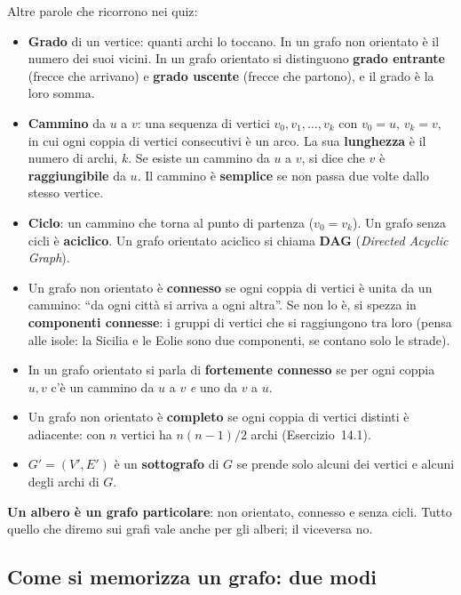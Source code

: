 Altre parole che ricorrono nei quiz:
\begin{itemize}
  \item \textbf{Grado} di un vertice: quanti archi lo toccano. In un grafo non orientato
        è il numero dei suoi vicini. In un grafo orientato si distinguono \textbf{grado
        entrante} (frecce che arrivano) e \textbf{grado uscente} (frecce che partono), e
        il grado è la loro somma.
  \item \textbf{Cammino} da $u$ a $v$: una sequenza di vertici $v_0, v_1, \ldots, v_k$
        con $v_0 = u$, $v_k = v$, in cui ogni coppia di vertici consecutivi è un arco. La
        sua \textbf{lunghezza} è il numero di archi, $k$. Se esiste un cammino da $u$ a
        $v$, si dice che $v$ è \textbf{raggiungibile} da $u$. Il cammino è
        \textbf{semplice} se non passa due volte dallo stesso vertice.
  \item \textbf{Ciclo}: un cammino che torna al punto di partenza ($v_0 = v_k$). Un
        grafo senza cicli è \textbf{aciclico}. Un grafo orientato aciclico si chiama
        \textbf{DAG} (\emph{Directed Acyclic Graph}).
  \item Un grafo non orientato è \textbf{connesso} se ogni coppia di vertici è unita da un
        cammino: ``da ogni città si arriva a ogni altra''. Se non lo è, si spezza in
        \textbf{componenti connesse}: i gruppi di vertici che si raggiungono tra loro
        (pensa alle isole: la Sicilia e le Eolie sono due componenti, se contano solo le
        strade).
  \item In un grafo orientato si parla di \textbf{fortemente connesso} se per ogni coppia
        $u, v$ c'è un cammino da $u$ a $v$ \emph{e} uno da $v$ a $u$.
  \item Un grafo non orientato è \textbf{completo} se ogni coppia di vertici distinti è
        adiacente: con $n$ vertici ha $n(n-1)/2$ archi (Esercizio~14.1).
  \item $G' = (V', E')$ è un \textbf{sottografo} di $G$ se prende solo alcuni dei vertici e
        alcuni degli archi di $G$.
\end{itemize}

\textbf{Un albero è un grafo particolare}: non orientato, connesso e senza cicli. Tutto
quello che diremo sui grafi vale anche per gli alberi; il viceversa no.

\subsection*{Come si memorizza un grafo: due modi}

